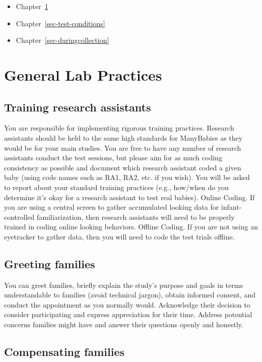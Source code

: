 \documentclass[
  letterpaper,
  DIV=11,
  numbers=noendperiod,
  oneside]{scrreprt}
\providecommand{\tightlist}{%
  \setlength{\itemsep}{0pt}\setlength{\parskip}{0pt}}
\begin{document}
\begin{itemize}
\tightlist
\item
  Chapter~\ref{sec-genlab}
\item
  Chapter~\ref{sec-test-conditions}
\item
  Chapter~\ref{sec-duringcollection}
\end{itemize}

\chapter{General Lab Practices}\label{sec-genlab}

\section{Training research
assistants}\label{training-research-assistants}

You are responsible for implementing rigorous training practices.
Research assistants should be held to the same high standards for
ManyBabies as they would be for your main studies. You are free to have
any number of research assistants conduct the test sessions, but please
aim for as much coding consistency as possible and document which
research assistant coded a given baby (using code names such as RA1,
RA2, etc. if you wish). You will be asked to report about your standard
training practices (e.g., how/when do you determine it's okay for a
research assistant to test real babies). Online Coding. If you are using
a central screen to gather accumulated looking data for
infant-controlled familiarization, then research assistants will need to
be properly trained in coding online looking behaviors. Offline Coding.
If you are not using an eyetracker to gather data, then you will need to
code the test trials offline.

\section{Greeting families}\label{greeting-families}

You can greet families, briefly explain the study's purpose and goals in
terms understandable to families (avoid technical jargon), obtain
informed consent, and conduct the appointment as you normally would.
Acknowledge their decision to consider participating and express
appreciation for their time. Address potential concerns families might
have and answer their questions openly and honestly.

\section{Compensating families}\label{compensating-families}
\end{document}
